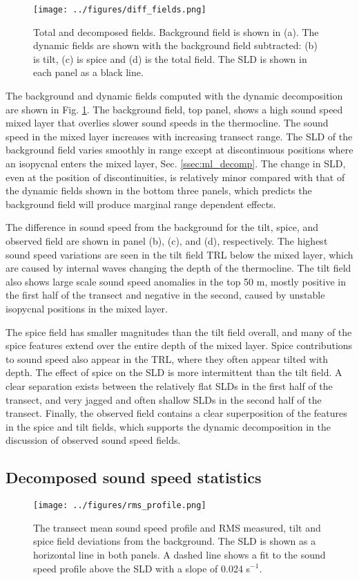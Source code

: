 \documentclass[preprint,NumberedRefs]{JASA}
\begin{document}
\begin{figure}
\texttt{[image: ../figures/diff\_fields.png]}
        \caption{\label{fig:c_fields}{Total and decomposed fields. Background field is shown in (a). The dynamic fields are shown with the background field subtracted: (b) is tilt, (c) is spice and (d) is the total field. The SLD is shown in each panel as a black line.}}
\end{figure}

The background and dynamic fields computed with the dynamic decomposition are shown in Fig. \ref{fig:c_fields}. The background field, top panel, shows a high sound speed mixed layer that overlies slower sound speeds in the thermocline. The sound speed in the mixed layer increases with increasing transect range. The SLD of the background field varies smoothly in range except at discontinuous positions where an isopycnal enters the mixed layer, Sec. \ref{ssec:ml_decomp}. The change in SLD, even at the position of discontinuities, is relatively minor compared with that of the dynamic fields shown in the bottom three panels, which predicts the background field will produce marginal range dependent effects.

The difference in sound speed from the background for the tilt, spice, and observed field are shown in panel (b), (c), and (d), respectively. The highest sound speed variations are seen in the tilt field TRL below the mixed layer, which are caused by internal waves changing the depth of the thermocline\cite{colosi21}. The tilt field also shows large scale sound speed anomalies in the top 50 m, mostly positive in the first half of the transect and negative in the second, caused by unstable isopycnal positions in the mixed layer.

The spice field has smaller magnitudes than the tilt field overall, and many of the spice features extend over the entire depth of the mixed layer. Spice contributions to sound speed also appear in the TRL, where they often appear tilted with depth. The effect of spice on the SLD is more intermittent than the tilt field. A clear separation exists between the relatively flat SLDs in the first half of the transect, and very jagged and often shallow SLDs in the second half of the transect. Finally, the observed field contains a clear superposition of the features in the spice and tilt fields, which supports the dynamic decomposition in the discussion of observed sound speed fields.

\subsection{Decomposed sound speed statistics}
\begin{figure}
\texttt{[image: ../figures/rms\_profile.png]}
        \caption{\label{fig:c_rms}{The transect mean sound speed profile and RMS measured, tilt and spice field deviations from the background. The SLD is shown as a horizontal line in both panels. A dashed line shows a fit to the sound speed profile above the SLD with a slope of 0.024 s$^{-1}$.}}
\end{figure}
\end{document}

